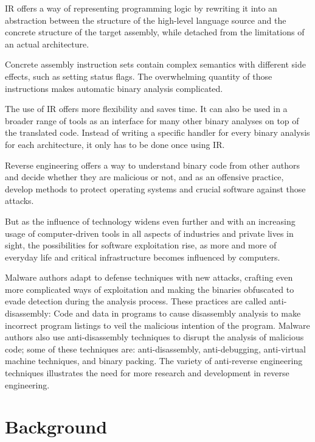 \documentclass[seminar]{plai}
\begin{document}
IR offers a way of representing programming logic by rewriting it into an abstraction between the structure of the high-level language source and the concrete structure of the target assembly, while detached from the limitations of an actual architecture.

Concrete assembly instruction sets contain complex semantics with different side effects, such as setting status flags.
The overwhelming quantity of those instructions makes automatic binary analysis complicated.

The use of IR offers more flexibility and saves time. It can also be used in a broader range of tools as an interface for many other binary analyses on top of the translated code. Instead of writing a specific handler for every binary analysis for each architecture, it only has to be done once using IR.

Reverse engineering offers a way to understand binary code from other authors and decide whether they are malicious or not, and as an offensive practice, develop methods to protect operating systems and crucial software against those attacks.

But as the influence of technology widens even further and with an increasing usage of computer-driven tools in all aspects of industries and private lives in sight, the possibilities for software exploitation rise, as more and more of everyday life and critical infrastructure becomes influenced by computers.

Malware authors adapt to defense techniques with new attacks, crafting even more complicated ways of exploitation and making the binaries obfuscated to evade detection during the analysis process.
These practices are called anti-disassembly: Code and data in programs to cause disassembly analysis to make incorrect program listings to veil the malicious intention of the program.
Malware authors also use anti-disassembly techniques to disrupt the analysis of malicious code; some of these techniques are: anti-disassembly, anti-debugging, anti-virtual machine techniques, and binary packing.\cite{practical-malware-analysis}
The variety of anti-reverse engineering techniques illustrates the need for more research and development in reverse engineering.

\section{Background}
\label{sec:background}
\end{document}
